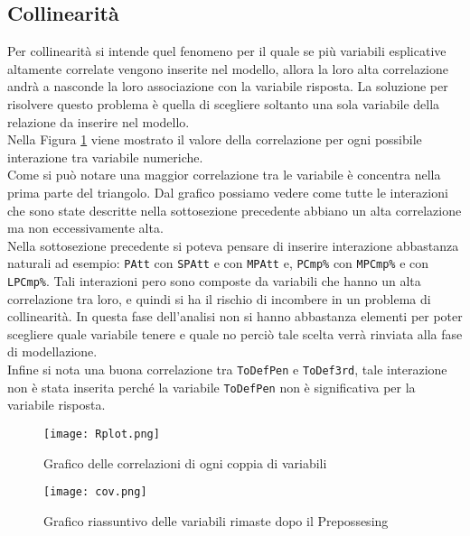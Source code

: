 \subsection{Collinearità}
Per collinearità si intende quel fenomeno per il quale se più variabili esplicative altamente correlate vengono inserite nel modello, allora la loro alta correlazione andrà a nasconde la loro associazione con la variabile risposta. La soluzione per risolvere questo problema è quella di scegliere soltanto una sola variabile della relazione da inserire nel modello.\\
Nella Figura \ref{fig:cor} viene mostrato il valore della correlazione per ogni possibile interazione tra variabile numeriche.\\
Come si può notare una maggior correlazione tra le variabile è concentra nella prima parte del triangolo. Dal grafico possiamo vedere come tutte le interazioni che sono state descritte nella sottosezione precedente abbiano un alta correlazione ma non eccessivamente alta. \\
Nella sottosezione precedente si poteva pensare di inserire interazione abbastanza naturali ad esempio: \texttt{PAtt} con \texttt{SPAtt} e con \texttt{MPAtt} e, \texttt{PCmp\%} con \texttt{MPCmp\%} e con \texttt{LPCmp\%}. Tali interazioni pero sono composte da variabili che hanno un alta correlazione tra loro, e quindi si ha il rischio di incombere in un problema di collinearità. In questa fase dell'analisi non si hanno abbastanza elementi per poter scegliere quale variabile tenere e quale no perciò tale scelta verrà rinviata alla fase di modellazione.\\
Infine si nota una buona correlazione tra \texttt{ToDefPen} e \texttt{ToDef3rd}, tale interazione non è stata inserita perché la variabile \texttt{ToDefPen} non è significativa per la variabile risposta.

\begin{figure}[htbp]
	\begin{center}
		\texttt{[image: Rplot.png]}
		\caption{Grafico delle correlazioni di ogni coppia di variabili}  \label{fig:cor}
	\end{center}
\end{figure}

\begin{figure}[htbp]
	\begin{center}
		\texttt{[image: cov.png]}
		\caption{Grafico riassuntivo delle variabili rimaste dopo il Prepossesing}  \label{fig:cov}
	\end{center}
\end{figure}

